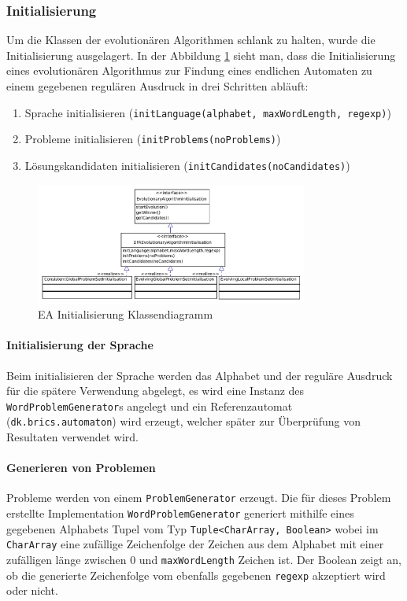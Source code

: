 \subsubsection{Initialisierung}
Um die Klassen der evolutionären Algorithmen schlank zu halten, wurde die Initialisierung ausgelagert. In der Abbildung \ref{fig:ea_init_classdiag_simple} sieht man, dass die Initialisierung eines evolutionären Algorithmus zur Findung eines endlichen Automaten zu einem gegebenen regulären Ausdruck in drei Schritten abläuft:
\begin{enumerate}
	\item Sprache initialisieren (\lstinline$initLanguage(alphabet, maxWordLength, regexp)$)
	\item Probleme initialisieren (\lstinline$initProblems(noProblems)$)
	\item Lösungskandidaten initialisieren (\lstinline$initCandidates(noCandidates)$)
\end{enumerate}

\begin{figure}[h]
  \centering
  \includegraphics[width=0.8\textwidth]{images/simple_uml_evolution_initialisation.pdf}
  \caption[EA Initialisierung Klassendiagramm]{EA Initialisierung Klassendiagramm}
  \label{fig:ea_init_classdiag_simple}
\end{figure}

\paragraph{Initialisierung der Sprache}
Beim initialisieren der Sprache werden das Alphabet und der reguläre Ausdruck für die spätere Verwendung abgelegt, es wird eine Instanz des \lstinline$WordProblemGenerator$s angelegt und ein Referenzautomat (\lstinline$dk.brics.automaton$) wird erzeugt, welcher später zur Überprüfung von Resultaten verwendet wird.

\paragraph{Generieren von Problemen}
Probleme werden von einem \lstinline$ProblemGenerator$ erzeugt. Die für dieses Problem erstellte Implementation \lstinline$WordProblemGenerator$ generiert mithilfe eines gegebenen Alphabets Tupel vom Typ \lstinline$Tuple<CharArray, Boolean>$ wobei im \lstinline$CharArray$ eine zufällige Zeichenfolge der Zeichen aus dem Alphabet mit einer zufälligen länge zwischen 0 und \lstinline$maxWordLength$ Zeichen ist. Der Boolean zeigt an, ob die generierte Zeichenfolge vom ebenfalls gegebenen \lstinline$regexp$ akzeptiert wird oder nicht.

